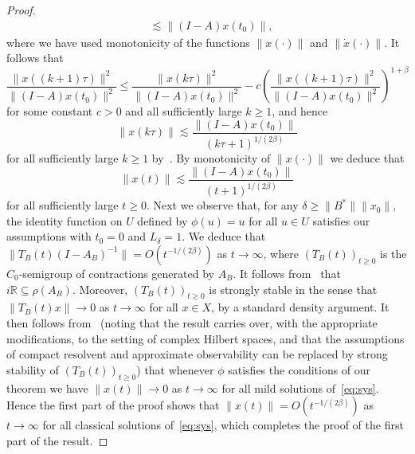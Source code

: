 \documentclass[11pt, a4paper]{amsart}
\newcommand{\RR}{\mathbb{R}}
\newcommand{\inv}{^{-1}}
\theoremstyle{definition}
\numberwithin{equation}{section}
\begin{document}
\begin{proof}
$$\begin{aligned}
&\lesssim\|(I-A)x(t_0)\|,
\end{aligned}
$$
where we have used monotonicity of the functions $\|x(\cdot)\|$ and $\|\dot{x}(\cdot)\|$. It follows that
$$\frac{\|x((k+1)\tau)\|^2}{\|(I-A)x(t_0)\|^2}\le\frac{\|x(k\tau)\|^2}{\|(I-A)x(t_0)\|^2}-c\left(\frac{\|x((k+1)\tau)\|^2}{\|(I-A)x(t_0)\|^2}\right)^{1+\beta}$$
for some constant $c>0$ and all sufficiently large $k\ge1$, and hence
$$\|x(k\tau)\|\lesssim \frac{\|(I-A)x(t_0)\|}{(k\tau+1)^{1/(2\beta)}}$$
for all sufficiently large $k\ge1$ by~\cite[Lem.~1.3.4]{AmmNic15book}. By monotonicity of $\|x(\cdot)\|$ we deduce that 
$$\|x(t)\|\lesssim \frac{\|(I-A)x(t_0)\|}{(t+1)^{1/(2\beta)}}$$
for all sufficiently large $t\ge0$. Next we observe that, for any $\delta\ge\|B^*\|\|x_0\|$, the identity function on $U$ defined by $\phi(u)=u$ for all $u\in U$ satisfies our assumptions  with $t_0=0$ and $L_\delta=1$. We deduce that
$\|T_B(t)(I-A_B)\inv\|=O(t^{-1/(2\beta)})$ as $t\to\infty$, where $(T_B(t))_{t\ge0}$ is the $C_0$-semigroup of contractions generated by $A_B$. It follows from~\cite[Thm.~1.1]{BatDuy08} that $i\RR\subseteq\rho(A_B)$. Moreover, $(T_B(t))_{t\ge0}$ is strongly stable in the sense that $\|T_B(t)x\|\to0$ as $t\to\infty$ for all $x\in X$, by a standard density argument. It then follows from~\cite[Thm.~2.2]{CurZwa16} (noting that the result carries over, with the appropriate modifications, to the setting of complex Hilbert spaces, and that the assumptions of compact resolvent and approximate observability can be replaced by strong stability of $(T_B(t))_{t\ge0}$) that whenever $\phi$ satisfies the conditions of our theorem we have $\|x(t)\|\to0$ as $t\to\infty$ for all  mild solutions of~\eqref{eq:sys}. Hence the first part of the proof shows that $\|x(t)\|=O(t^{-1/(2\beta)})$ as $t\to\infty$ for  all classical solutions of~\eqref{eq:sys}, which completes the proof of the first part of the result.


\end{proof}
\end{document}
